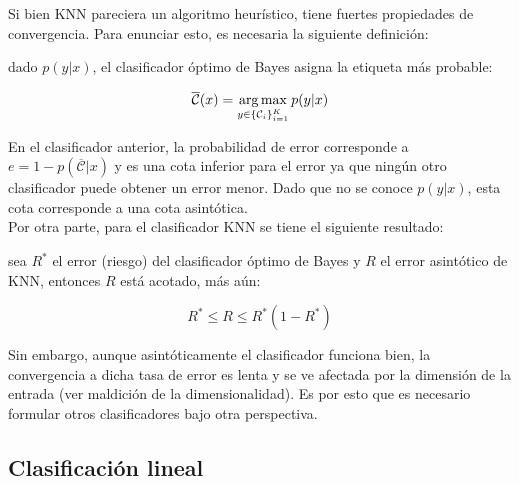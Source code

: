 Si bien KNN pareciera un algoritmo heurístico, tiene fuertes propiedades de convergencia. Para enunciar esto, es necesaria la siguiente definición:

\begin{definition}
	dado $p(y|x)$, el clasificador óptimo de Bayes asigna la etiqueta más probable:
	
	\begin{equation}
		\overline{\mathcal{C}}(x)=\operatorname*{arg\,max}_{y\in \{{\mathcal C}_i\}_{i=1}^K} p(y|x)
	\end{equation}
\end{definition}

En el clasificador anterior, la probabilidad de error corresponde a $e = 1 - p(\overline{\mathcal{C}}|x)$ y es una cota inferior para el error ya que ningún otro clasificador puede obtener un error menor. Dado que no se conoce $p(y|x)$, esta cota corresponde a una cota asintótica.\\

Por otra parte, para el clasificador KNN se tiene el siguiente resultado:

\begin{theorem} sea $R^*$ el error (riesgo) del clasificador óptimo de Bayes y $R$ el error asintótico de KNN, entonces $R$ está acotado, más aún:

\begin{equation}
	R^*\leq R\leq R^*(1-R^*)
\end{equation}
	
\end{theorem}

Sin embargo, aunque asintóticamente el clasificador funciona bien, la convergencia a dicha tasa de error es lenta y se ve afectada por la dimensión de la entrada (ver maldición de la dimensionalidad). Es por esto que es necesario formular otros clasificadores bajo otra perspectiva.


\subsection{Clasificación lineal}
\label{sec:clasif_lineal}

